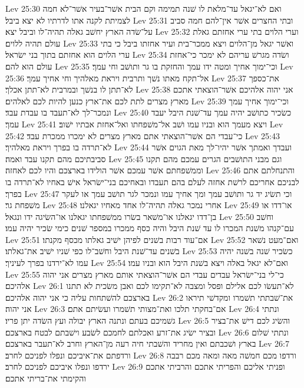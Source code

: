 Lev 25:30  ואם לא־יגאל עד־מלאת לו שׁנה תמימה וקם הבית אשׁר־בעיר אשׁר־לא חמה לצמיתת לקנה אתו לדרתיו לא יצא ביבל׃
Lev 25:31  ובתי החצרים אשׁר אין־להם חמה סביב על־שׂדה הארץ יחשׁב גאלה תהיה־לו וביבל יצא׃
Lev 25:32  וערי הלוים בתי ערי אחזתם גאלת עולם תהיה ללוים׃
Lev 25:33  ואשׁר יגאל מן־הלוים ויצא ממכר־בית ועיר אחזתו ביבל כי בתי ערי הלוים הוא אחזתם בתוך בני ישׂראל׃
Lev 25:34  ושׂדה מגרשׁ עריהם לא ימכר כי־אחזת עולם הוא להם׃
Lev 25:35  וכי־ימוך אחיך ומטה ידו עמך והחזקת בו גר ותושׁב וחי עמך׃
Lev 25:36  אל־תקח מאתו נשׁך ותרבית ויראת מאלהיך וחי אחיך עמך׃
Lev 25:37  את־כספך לא־תתן לו בנשׁך ובמרבית לא־תתן אכלך׃
Lev 25:38  אני יהוה אלהיכם אשׁר־הוצאתי אתכם מארץ מצרים לתת לכם את־ארץ כנען להיות לכם לאלהים׃
Lev 25:39  וכי־ימוך אחיך עמך ונמכר־לך לא־תעבד בו עבדת עבד׃
Lev 25:40  כשׂכיר כתושׁב יהיה עמך עד־שׁנת היבל יעבד עמך׃
Lev 25:41  ויצא מעמך הוא ובניו עמו ושׁב אל־משׁפחתו ואל־אחזת אבתיו ישׁוב׃
Lev 25:42  כי־עבדי הם אשׁר־הוצאתי אתם מארץ מצרים לא ימכרו ממכרת עבד׃
Lev 25:43  לא־תרדה בו בפרך ויראת מאלהיך׃
Lev 25:44  ועבדך ואמתך אשׁר יהיו־לך מאת הגוים אשׁר סביבתיכם מהם תקנו עבד ואמה׃
Lev 25:45  וגם מבני התושׁבים הגרים עמכם מהם תקנו וממשׁפחתם אשׁר עמכם אשׁר הולידו בארצכם והיו לכם לאחזה׃
Lev 25:46  והתנחלתם אתם לבניכם אחריכם לרשׁת אחזה לעלם בהם תעבדו ובאחיכם בני־ישׂראל אישׁ באחיו לא־תרדה בו בפרך׃
Lev 25:47  וכי תשׂיג יד גר ותושׁב עמך ומך אחיך עמו ונמכר לגר תושׁב עמך או לעקר משׁפחת גר׃
Lev 25:48  אחרי נמכר גאלה תהיה־לו אחד מאחיו יגאלנו׃
Lev 25:49  או־דדו או בן־דדו יגאלנו או־משׁאר בשׂרו ממשׁפחתו יגאלנו או־השׂיגה ידו ונגאל׃
Lev 25:50  וחשׁב עם־קנהו משׁנת המכרו לו עד שׁנת היבל והיה כסף ממכרו במספר שׁנים כימי שׂכיר יהיה עמו׃
Lev 25:51  אם־עוד רבות בשׁנים לפיהן ישׁיב גאלתו מכסף מקנתו׃
Lev 25:52  ואם־מעט נשׁאר בשׁנים עד־שׁנת היבל וחשׁב־לו כפי שׁניו ישׁיב את־גאלתו׃
Lev 25:53  כשׂכיר שׁנה בשׁנה יהיה עמו לא־ירדנו בפרך לעיניך׃
Lev 25:54  ואם־לא יגאל באלה ויצא בשׁנת היבל הוא ובניו עמו׃
Lev 25:55  כי־לי בני־ישׂראל עבדים עבדי הם אשׁר־הוצאתי אותם מארץ מצרים אני יהוה אלהיכם׃
Lev 26:1  לא־תעשׂו לכם אלילם ופסל ומצבה לא־תקימו לכם ואבן משׂכית לא תתנו בארצכם להשׁתחות עליה כי אני יהוה אלהיכם׃
Lev 26:2  את־שׁבתתי תשׁמרו ומקדשׁי תיראו אני יהוה׃
Lev 26:3  אם־בחקתי תלכו ואת־מצותי תשׁמרו ועשׂיתם אתם׃
Lev 26:4  ונתתי גשׁמיכם בעתם ונתנה הארץ יבולה ועץ השׂדה יתן פריו׃
Lev 26:5  והשׂיג לכם דישׁ את־בציר ובציר ישׂיג את־זרע ואכלתם לחמכם לשׂבע וישׁבתם לבטח בארצכם׃
Lev 26:6  ונתתי שׁלום בארץ ושׁכבתם ואין מחריד והשׁבתי חיה רעה מן־הארץ וחרב לא־תעבר בארצכם׃
Lev 26:7  ורדפתם את־איביכם ונפלו לפניכם לחרב׃
Lev 26:8  ורדפו מכם חמשׁה מאה ומאה מכם רבבה ירדפו ונפלו איביכם לפניכם לחרב׃
Lev 26:9  ופניתי אליכם והפריתי אתכם והרביתי אתכם והקימתי את־בריתי אתכם׃
